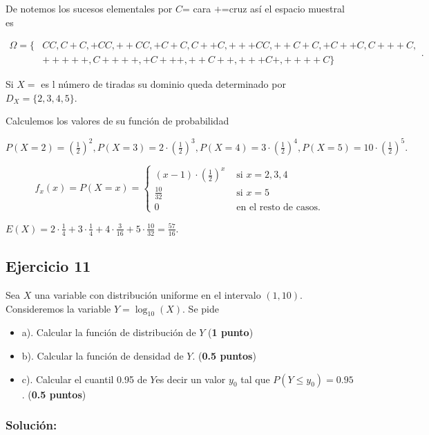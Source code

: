 \documentclass[
]{article}
\providecommand{\tightlist}{%
  \setlength{\itemsep}{0pt}\setlength{\parskip}{0pt}}
\begin{document}
De notemos los sucesos elementales por \(C\)= cara \(+\)=cruz así el
espacio muestral es

\[\begin{aligned}\Omega=\{&CC,C+C,+CC,++CC,+C+C,C++C,+++CC,++C+C,+C++C,C+++C,\\ & +++++,C++++,+C+++,++C++,+++C+,++++C\}\end{aligned}.\]

Si \(X=\) es l número de tiradas su dominio queda determinado por
\(D_X=\{2,3,4,5\}.\)

Calculemos los valores de su función de probabilidad

\(P(X=2)=\left(\frac{1}{2}\right)^2, P(X=3)=2\cdot\left(\frac{1}{2}\right)^3,P(X=4)=3\cdot\left(\frac{1}{2}\right)^4,P(X=5)=10\cdot \left(\frac{1}{2}\right)^5.\)

\[f_x(x)=P(X=x)= \left\{\begin{array}{ll} 
(x-1)\cdot \left(\frac{1}{2}\right)^x & \mbox{ si } x=2,3,4\\
\frac{10}{32}& \mbox{ si } x=5\\
0 & \mbox{ en el resto de casos.}
\end{array}
\right.
\]

\(E(X)=2\cdot\frac{1}{4}+3\cdot \frac{1}{4}+ 4\cdot \frac{3}{16}+5\cdot \frac{10}{32}=\frac{57}{16}.\)

\hypertarget{ejercicio-11}{%
\subsection{Ejercicio 11}\label{ejercicio-11}}

Sea \(X\) una variable con distribución uniforme en el intervalo
\((1,10)\). Consideremos la variable \(Y=\log_{10}(X)\). Se pide

\begin{itemize}
\tightlist
\item
  a). Calcular la función de distribución de \(Y\) (\textbf{1 punto})
\item
  b). Calcular la función de densidad de \(Y\). (\textbf{0.5 puntos})
\item
  c). Calcular el cuantil 0.95 de \(Y\)es decir un valor \(y_0\) tal que
  \(P(Y\leq y_0)=0.95\). (\textbf{0.5 puntos})
\end{itemize}

\hypertarget{soluciuxf3n-10}{%
\subsubsection{Solución:}\label{soluciuxf3n-10}}
\end{document}
